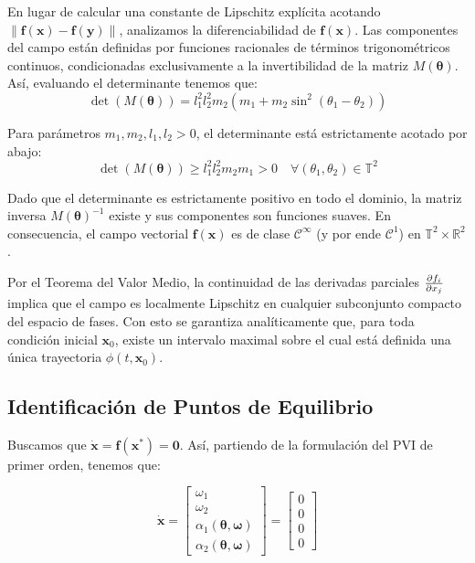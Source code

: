 \documentclass[13pt]{extarticle}
\begin{document}
En lugar de calcular una constante de Lipschitz explícita acotando $\| \mathbf{f}(\mathbf{x}) - \mathbf{f}(\mathbf{y}) \|$, analizamos la diferenciabilidad de $\mathbf{f}(\mathbf{x})$. Las componentes del campo están definidas por funciones racionales de términos trigonométricos continuos, condicionadas exclusivamente a la invertibilidad de la matriz $M(\boldsymbol{\theta})$. Así, evaluando el determinante tenemos que:
\begin{equation}
    \det(M(\boldsymbol{\theta})) = l_1^2 l_2^2 m_2 (m_1 + m_2 \sin^2(\theta_1 - \theta_2))
\end{equation}

Para parámetros $m_1, m_2, l_1, l_2 > 0$, el determinante está estrictamente acotado por abajo:
\begin{equation}
    \det(M(\boldsymbol{\theta})) \geq l_1^2 l_2^2 m_2 m_1 > 0 \quad \forall (\theta_1, \theta_2) \in \mathbb{T}^2
\end{equation}

Dado que el determinante es estrictamente positivo en todo el dominio, la matriz inversa $M(\boldsymbol{\theta})^{-1}$ existe y sus componentes son funciones suaves. En consecuencia, el campo vectorial $\mathbf{f}(\mathbf{x})$ es de clase $\mathcal{C}^\infty$ (y por ende $\mathcal{C}^1$) en $\mathbb{T}^2 \times \mathbb{R}^2$. 

Por el Teorema del Valor Medio, la continuidad de las derivadas parciales $\pdv{f_i}{x_j}$ implica que el campo es localmente Lipschitz en cualquier subconjunto compacto del espacio de fases. Con esto se garantiza analíticamente que, para toda condición inicial $\mathbf{x}_0$, existe un intervalo maximal sobre el cual está definida una única trayectoria $\phi(t, \mathbf{x}_0)$.

\subsection{Identificación de Puntos de Equilibrio}


Buscamos que $\dot{\mathbf{x}} = \mathbf{f}(\mathbf{x}^*) = \mathbf{0}$. Así, partiendo de la formulación del PVI de primer orden, tenemos que:

\begin{equation}
\dot{\mathbf{x}} = \begin{bmatrix} \omega_1 \\ \omega_2 \\ \alpha_1(\boldsymbol{\theta}, \boldsymbol{\omega}) \\ \alpha_2(\boldsymbol{\theta}, \boldsymbol{\omega}) \end{bmatrix} = \begin{bmatrix} 0 \\ 0 \\ 0 \\ 0 \end{bmatrix}
\end{equation}
\end{document}
